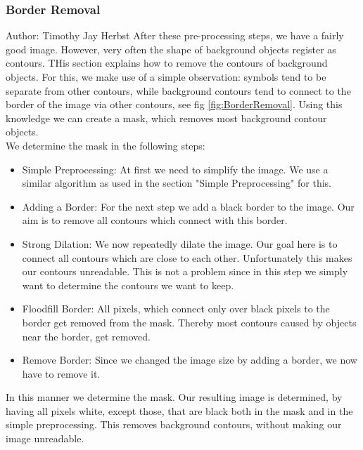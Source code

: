 \documentclass[12pt]{article}
\begin{document}
	\subsubsection{Border Removal}%
		\small{Author: Timothy Jay Herbst} \newline \newline
		After these pre-processing steps, we have a fairly good image.
		However, very often the shape of background objects register as contours.
		THis section explains how to remove the contours of background objects.
		For this, we make use of a simple observation: symbols tend to be separate from other contours, while background contours tend to connect to the border of the image via other contours, see fig \ref{fig:BorderRemoval}.
		Using this knowledge we can create a mask, which removes most background contour objects.\\
		We determine the mask in the following steps:
		\begin{itemize}
			\item Simple Preprocessing: At first we need to simplify the image. We use a similar algorithm as used in the section "Simple Preprocessing" for this.
			\item Adding a Border: For the next step we add a black border to the image. Our aim is to remove all contours which connect with this border.
			\item Strong Dilation: We now repeatedly dilate the image. Our goal here is to connect all contours which are close to each other.
			Unfortunately this makes our contours unreadable.
			This is not a problem since in this step we simply want to determine the contours we want to keep.
			\item Floodfill Border: All pixels, which connect only over black pixels to the border get removed from the mask.
			Thereby most contours caused by objects near the border, get removed.
			\item Remove Border: Since we changed the image size by adding a border, we now have to remove it.
		\end{itemize}
		In this manner we determine the mask.
		Our resulting image is determined, by having all pixels white, except those, that are black both in the mask and in the simple preprocessing.
		This removes background contours, without making our image unreadable.
\end{document}
